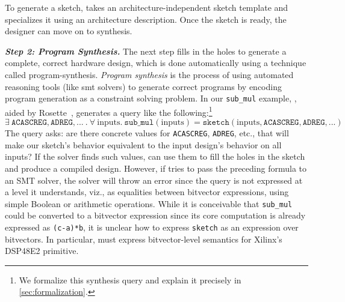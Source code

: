 To generate a sketch,
  \lr takes an architecture-independent
  sketch template
  and specializes it using an
  architecture description.
Once the sketch is ready,
  the designer can move on to synthesis.

\textit{\textbf{Step 2: Program Synthesis.}}
  The next step 
  fills
  in the holes to generate
  a complete, correct
  hardware design,
  which is done automatically
  using a technique called
  \gls{program-synthesis}.
\textit{Program synthesis} is the process of
  using automated reasoning tools
  (like \gls{smt} solvers) 
  to generate correct programs
  by encoding program generation
  as a constraint solving problem.
In our \texttt{sub\_mul} example,
  \lr, aided  by
  Rosette~\cite{torlak2013growing,torlak2014lightweight}, 
  generates a query like the following:\footnote{
  We formalize this synthesis query and explain it precisely in \cref{sec:formalization}.
}
\footnotesize
$$\exists \ \mathtt{ACASCREG}, \mathtt{ADREG}, ...\ .\ \forall \ \mathrm{inputs} . \ 
  \texttt{sub\_mul}(\mathrm{inputs}) 
  = \texttt{sketch}(\mathrm{inputs}, \mathtt{ACASCREG}, \mathtt{ADREG}, ...)
$$
\normalsize
The query asks:
  are there concrete values for
  \texttt{ACASCREG}, \texttt{ADREG}, etc.,
  that will make our sketch's behavior
  equivalent to the input design's behavior
  on all inputs?
If the solver finds such values,
\lr can use them to fill the holes
  in the sketch
  and produce a compiled design.
However, if \lr tries to pass the preceding formula
  to an SMT solver,
  the solver will throw an error since
  the query is not expressed
  at a level 
 it understands, viz., %
  as equalities
  between bitvector expressions,
  using simple Boolean or arithmetic
  operations.
While it is conceivable that \texttt{sub\_mul}
  could be converted to
  a bitvector expression
  since its core computation is already
  expressed as
  \texttt{(c-a)*b},
it is unclear how to express
  \texttt{sketch}
  as an expression over bitvectors.
In particular, \lr must express
  bitvector-level semantics
  for Xilinx's DSP48E2 primitive.

